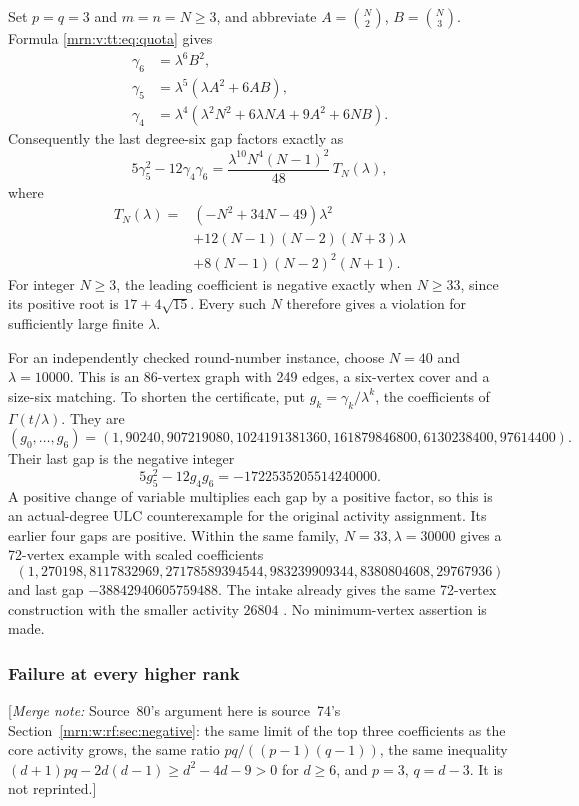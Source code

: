 \documentclass[11pt,a4paper]{article}
\theoremstyle{remark}\newtheorem{remark}[theorem]{Remark}
\newcommand{\mnote}[1]{[\textit{Merge note:} #1]}
\begin{document}
Set $p=q=3$ and $m=n=N\ge3$, and abbreviate $A=\binom N2$, $B=\binom N3$. Formula \eqref{mrn:v:tt:eq:quota} gives
\begin{align*}
 \gamma_6&=\lambda^6B^2,\\
 \gamma_5&=\lambda^5(\lambda A^2+6AB),\\
 \gamma_4&=\lambda^4(\lambda^2N^2+6\lambda NA+9A^2+6NB).
\end{align*}
Consequently the last degree-six gap factors exactly as
\begin{equation}\label{mrn:v:tt:eq:factor}
 5\gamma_5^2-12\gamma_4\gamma_6
 =\frac{\lambda^{10}N^4(N-1)^2}{48}\,T_N(\lambda),
\end{equation}
where
\begin{align}
 T_N(\lambda)={}&(-N^2+34N-49)\lambda^2\nonumber\\
 &+12(N-1)(N-2)(N+3)\lambda\label{mrn:v:tt:eq:T}\\
 &+8(N-1)(N-2)^2(N+1).\nonumber
\end{align}
For integer $N\ge3$, the leading coefficient is negative exactly when $N\ge33$, since its positive root is $17+4\sqrt{15}$. Every such $N$ therefore gives a violation for sufficiently large finite $\lambda$.

For an independently checked round-number instance, choose $N=40$ and $\lambda=10000$. This is an 86-vertex graph with 249 edges, a six-vertex cover and a size-six matching. To shorten the certificate, put $g_k=\gamma_k/\lambda^k$, the coefficients of $\Gamma(t/\lambda)$. They are
\[
 (g_0,\ldots,g_6)=
 (1,90240,907219080,1024191381360,161879846800,6130238400,97614400).
\]
Their last gap is the negative integer
\begin{equation}\label{mrn:v:tt:eq:negative}
 5g_5^2-12g_4g_6=-1722535205514240000.
\end{equation}
A positive change of variable multiplies each gap by a positive factor, so this is an actual-degree ULC counterexample for the original activity assignment. Its earlier four gaps are positive. Within the same family, $N=33,\lambda=30000$ gives a 72-vertex example with scaled coefficients
\[
 (1,270198,8117832969,27178589394544,983239909344,8380804608,29767936)
\]
and last gap $-38842940605759488$. The intake already gives the same 72-vertex construction with the smaller activity $26804$ \cite{b:m74}. No minimum-vertex assertion is made.

\subsubsection{Failure at every higher rank}
\mnote{Source~80's argument here is source~74's
Section~\ref{mrn:w:rf:sec:negative}: the same limit of the top three
coefficients as the core activity grows, the same ratio
$pq/((p-1)(q-1))$, the same inequality
$(d+1)pq-2d(d-1)\ge d^2-4d-9>0$ for $d\ge6$, and $p=3$, $q=d-3$. It is not
reprinted.}
\end{document}
